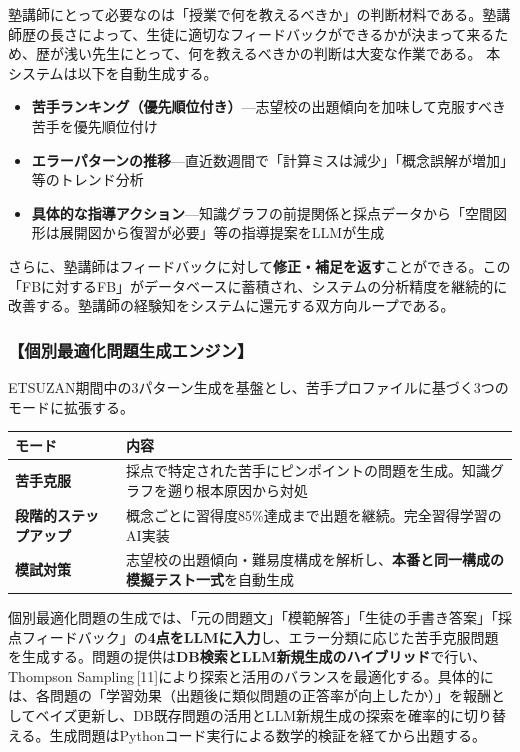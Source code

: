 \documentclass[paper=a4,fontsize=10.5bp,jafontsize=10.5bp,twocolumn]{jlreq}
\begin{document}
塾講師にとって必要なのは「授業で何を教えるべきか」の判断材料である。塾講師歴の長さによって、生徒に適切なフィードバックができるかが決まって来るため、歴が浅い先生にとって、何を教えるべきかの判断は大変な作業である。
本システムは以下を自動生成する。

\begin{itemize}
  \item \textbf{苦手ランキング（優先順位付き）}---志望校の出題傾向を加味して克服すべき苦手を優先順位付け
  \item \textbf{エラーパターンの推移}---直近数週間で「計算ミスは減少」「概念誤解が増加」等のトレンド分析
  \item \textbf{具体的な指導アクション}---知識グラフの前提関係と採点データから「空間図形は展開図から復習が必要」等の指導提案をLLMが生成
\end{itemize}

さらに、塾講師はフィードバックに対して\textbf{修正・補足を返す}ことができる。この「FBに対するFB」がデータベースに蓄積され、システムの分析精度を継続的に改善する。塾講師の経験知をシステムに還元する双方向ループである。

\subsubsection{【個別最適化問題生成エンジン】}

ETSUZAN期間中の3パターン生成を基盤とし、苦手プロファイルに基づく3つのモードに拡張する。

\begin{scriptsize}\noindent
\begin{tabularx}{\linewidth}{>{\bfseries}l X}
\toprule
モード & 内容 \\
\midrule
苦手克服 & 採点で特定された苦手にピンポイントの問題を生成。知識グラフを遡り根本原因から対処 \\
段階的ステップアップ & 概念ごとに習得度85\%達成まで出題を継続。完全習得学習のAI実装 \\
模試対策 & 志望校の出題傾向・難易度構成を解析し、\textbf{本番と同一構成の模擬テスト一式}を自動生成 \\
\bottomrule
\end{tabularx}
\end{scriptsize}

個別最適化問題の生成では、「元の問題文」「模範解答」「生徒の手書き答案」「採点フィードバック」の\textbf{4点をLLMに入力}し、エラー分類に応じた苦手克服問題を生成する。問題の提供は\textbf{DB検索とLLM新規生成のハイブリッド}で行い、Thompson Sampling\,[11]により探索と活用のバランスを最適化する。具体的には、各問題の「学習効果（出題後に類似問題の正答率が向上したか）」を報酬としてベイズ更新し、DB既存問題の活用とLLM新規生成の探索を確率的に切り替える。生成問題はPythonコード実行による数学的検証を経てから出題する。
\end{document}
